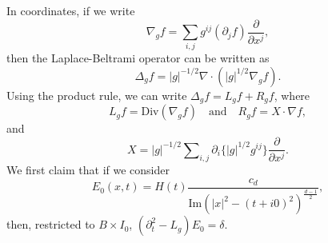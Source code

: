 In coordinates, if we write
%
\[ \nabla_g f = \sum_{i,j} g^{ij} (\partial_j f) \frac{\partial}{\partial x^j}, \]
%
then the Laplace-Beltrami operator can be written as
%
\[ \Delta_g f = |g|^{-1/2} \nabla \cdot (|g|^{1/2} \nabla_g f). \]
%
Using the product rule, we can write $\Delta_g f = L_g f + R_g f$, where
%
\[ L_g f = \text{Div}(\nabla_g f) \quad\text{and}\quad R_g f = X \cdot \nabla f, \]
%
and
%
\[ X = |g|^{-1/2} \sum\nolimits_{i,j} \partial_i \{ |g|^{1/2} g^{ij} \} \frac{\partial}{\partial x^j}. \]
%
We first claim that if we consider
%
\[ E_0(x,t) = H(t) \frac{c_d}{\text{Im}(|x|^2 - (t + i0)^2)^{\frac{d-1}{2}}}, \]
%
then, restricted to $B \times I_0$, $(\partial_t^2 - L_g) E_0 = \delta$.

\begin{comment}

For any $\phi \in \DD(B)$, define
%
\[ (\nabla_g \phi)(x) = \sum g^{ij}(x) \partial_j \phi(x) e_i = G(x)^{-1} \nabla \phi(x), \]
%
and for $X \in \DD(B,\RR^d)$,
%
\[ (\text{div}_g X)(x) = |G|^{-1/2}\; \nabla \cdot \{ |G|^{1/2} X \}. \]
%
If, for $\phi \in \DD(B)$, we set $\Delta_g \phi = \text{div}_g ( \nabla_g \phi )$, then
%
\[ \Delta_g (\phi \circ x) = (\Delta_g \phi) \circ x. \]
%
Similarily, if we define $\Box_g = \partial_t^2 - \Delta_g$ for elements of $\DD(B \times \RR)$, then
%
\[ \Box_g ( \phi \circ x ) = (\Box_g \phi) \circ x. \]
%
All the operators above are linear differential operators with smooth coefficients, and thus extend by duality to operators defined on distributions on $B$. If we define
%
\[ \nabla_g^* X = - \sum_{i,j} \partial_j \left\{ g^{ij} X_i \right\} = - \nabla \cdot G^{-1} X; \]
%
and
%
\[ \text{div}_g^* \phi = - |G|^{1/2} \nabla \{ |G|^{-1/2} \phi \}, \]%
%
Then for a distribution $u$, and a vector-valued distribution $v$,
%
\[ ( \nabla_g u, X ) = ( u, \nabla_g^* X ) \quad\text{and}\quad ( \text{div}_g(v), Y ) = ( v, \text{div}_g^* Y ). \]
%
Now let's construct the Hadamard parametrix.

For a distribution $u \in \DD(B)^*$, if we write
%
\[ a_G = |G|^{-1/2} G^{-1} \nabla \{ |G|^{1/2} \}, \]
%
then we can apply the product rule to write
%
\begin{align*}
    \Delta_g u &= \text{div}_g(\nabla_g u)\\
    &= |G|^{-1/2} ( \nabla \cdot \{ |G|^{1/2} \nabla_g u \} )\\
    &= (\nabla \cdot \nabla_g) u + a_G \cdot \nabla u\\
    &= L u + R u.
\end{align*}
%
We will be able to deal with the second-order differential operator $L$ using the radial symmetry of the metric (i.e. via the Gauss Lemma), whereas we will be able to deal with the first-order differential operator $R$ using an asymptotic expansion.

\end{comment}

